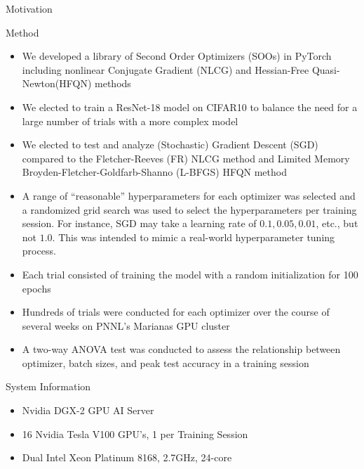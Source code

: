 \documentclass[final]{beamer}
\newlength{\colwidth}
\begin{document}
\begin{frame}[t]
\begin{columns}[t]
\begin{column}{\colwidth}
\begin{alertblock}{Motivation}
      \end{alertblock}

      \begin{block}{Method}
        \begin{itemize}
          \item We developed a library of Second Order Optimizers (SOOs) in PyTorch including nonlinear
                Conjugate Gradient (NLCG) and Hessian-Free Quasi-Newton(HFQN) methods
          \item We elected to train a ResNet-18 model on CIFAR10 to balance the need for a large
                number of trials with a more complex model
          \item We elected to test and analyze (Stochastic) Gradient Descent (SGD) compared to the
                Fletcher-Reeves (FR) NLCG method and Limited Memory Broyden-Fletcher-Goldfarb-Shanno
                (L-BFGS) HFQN method
          \item A range of ``reasonable'' hyperparameters for each optimizer was selected and a
                randomized grid search was used to select the hyperparameters per training session.
                For instance, SGD may take a learning rate of $0.1, 0.05, 0.01$, etc., but not $1.0$.
                This was intended to mimic a real-world hyperparameter tuning process.
          \item Each trial consisted of training the model with a random initialization for 100 epochs
          \item Hundreds of trials were conducted for each optimizer over the course of several
                weeks on PNNL's Marianas GPU cluster
          \item A two-way ANOVA test was conducted to assess the relationship between optimizer,
                batch sizes, and peak test accuracy in a training session
        \end{itemize}

      \end{block}
      \begin{block}{System Information}
        \begin{itemize}
          \item Nvidia DGX-2 GPU AI Server
          \item 16 Nvidia Tesla V100 GPU's, 1 per Training Session
          \item Dual Intel Xeon Platinum 8168, 2.7GHz, 24-core
        \end{itemize}
      \end{block}


\end{column}
\end{columns}
\end{frame}
\end{document}
